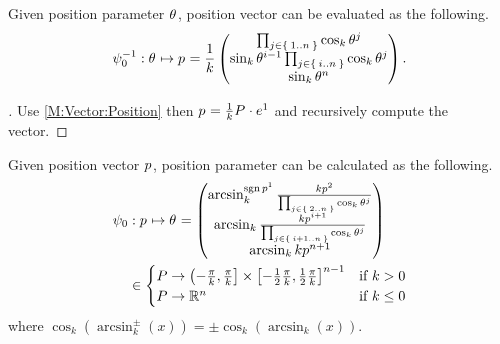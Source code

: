 \documentclass[stu, babel, american, biblatex, a4paper, leqno, draftall]{apa7}
\begin{document}
\begin{lemma}\label{M:Vector:Value}
    Given position parameter $\tensor{\theta}{}$, position vector can be evaluated as the following.
    \begin{equation*}
        \psi_0^{-1}: \tensor{\theta}{} \mapsto \tensor{p}{}
        = \frac{1}{k}
        \begin{pmatrix}
            \prod_{j\in\Set{1..n}}{\cos_k{\tensor{\theta}{^j}}}                                \\
            \sin_k{\tensor{\theta}{^{i-1}}}\prod_{j\in\Set{i..n}}{\cos_k{\tensor{\theta}{^j}}} \\
            \sin_k{{\tensor{\theta}{^n}}}                                                      \\
        \end{pmatrix}\text{.}
    \end{equation*}
\end{lemma}
\begin{proof}[]
    \skipped

    Use \cref{M:Vector:Position} then $\tensor{p}{}=\frac{1}{k}\tensor{P}{}\cdot\tensor{e}{^1}$ and recursively compute the vector.
\end{proof}
\begin{lemma}\label{PositionParameterValue}
    Given position vector $\tensor{p}{}$, position parameter can be calculated as the following.
    \begin{align*}
        \psi_0
         & : \tensor{p}{} \mapsto \tensor{\theta}{}
        =
        \begin{pmatrix}
            \arcsin_k^{\sign{\tensor{p}{^1}}}{\frac{k\tensor{p}{^2}}{\prod_{j\in\Set{2..n}}{\cos_k{\tensor{\theta}{^j}}}}} \\
            \arcsin_k{\frac{k\tensor{p}{^{i+1}}}{\prod_{j\in\Set{i+1..n}}{\cos_k{\tensor{\theta}{^j}}}}}                   \\
            \arcsin_k{k\tensor{p}{^{n+1}}}                                                                                 \\
        \end{pmatrix}                  \\
         & \in
        \begin{cases}
            P \to \left(-\frac{\pi}{k}, \frac{\pi}{k}\right]\times\left[-\frac{1}{2}\frac{\pi}{k}, \frac{1}{2}\frac{\pi}{k}\right]^{n-1} & \text{if $k>0$}   \\
            P \to \R^{n}                                                                                                              & \text{if $k\le0$} \\
        \end{cases}
    \end{align*}
    where $\cos_k\left(\arcsin_k^{\pm}\left(x\right)\right) = \pm \cos_k\left(\arcsin_k\left(x\right)\right)$.
\end{lemma}
\end{document}
